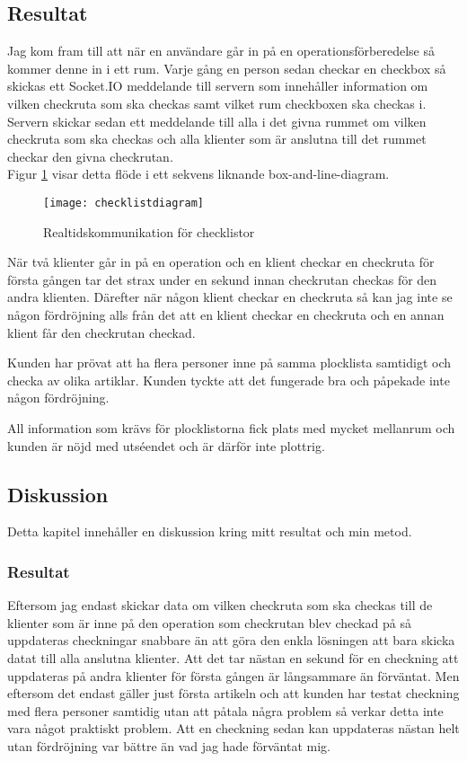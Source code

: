 \subsection{Resultat}
Jag kom fram till att när en användare går in på en operationsförberedelse så kommer denne in i ett rum. Varje gång en person sedan checkar en checkbox så skickas ett Socket.IO meddelande till servern som innehåller information om vilken checkruta som ska checkas samt vilket rum checkboxen ska checkas i. Servern skickar sedan ett meddelande till alla i det givna rummet om vilken checkruta som ska checkas och alla klienter som är anslutna till det rummet checkar den givna checkrutan.
\\Figur \ref{kommunikation} visar detta flöde i ett sekvens liknande box-and-line-diagram.
\begin{figure}
\texttt{[image: checklistdiagram]}
\caption{Realtidskommunikation för checklistor}
\label{kommunikation}
\end{figure}


När två klienter går in på en operation och en klient checkar en checkruta för första gången tar det strax under en sekund innan checkrutan checkas för den andra klienten. Därefter när någon klient checkar en checkruta så kan jag inte se någon fördröjning alls från det att en klient checkar en checkruta och en annan klient får den checkrutan checkad.

Kunden har prövat att ha flera personer inne på samma plocklista samtidigt och checka av olika artiklar. Kunden tyckte att det fungerade bra och påpekade inte någon fördröjning. 

All information som krävs för plocklistorna fick plats med mycket mellanrum och kunden är nöjd med utséendet och är därför inte plottrig.

\subsection{Diskussion}
Detta kapitel innehåller en diskussion kring mitt resultat och min metod.
\subsubsection{Resultat}
Eftersom jag endast skickar data om vilken checkruta som ska checkas till de klienter som är inne på den operation som checkrutan blev checkad på så uppdateras checkningar snabbare än att göra den enkla lösningen att bara skicka datat till alla anslutna klienter. Att det tar nästan en sekund för en checkning att uppdateras på andra klienter för första gången är långsammare än förväntat. Men eftersom det endast gäller just första artikeln och att kunden har testat checkning med flera personer samtidig utan att påtala några problem så verkar detta inte vara något praktiskt problem. Att en checkning sedan kan uppdateras nästan helt utan fördröjning var bättre än vad jag hade förväntat mig.

